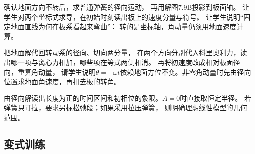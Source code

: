 \documentclass[UTF8,fontset=fandol,a4paper,11pt]{ctexart}
\begin{document}
确认地面方向不转后，求普通弹簧的径向运动，
再用解图7.9B投影到板面轴。
让学生对两个坐标式求导，在初始时刻读出板上的速度分量与符号。
让学生说明“固定地面直线为何在板系看起来弯曲”：
转的是坐标轴，角动量仍须用地面速度计算。

把地面解代回转动系的径向、切向两分量，
在两个方向分别代入科里奥利力，读出哪一项与离心力相加，哪些项在等式两侧相消。
再将初速度改成相对板面径向，重算角动量，
请学生说明$\theta=-\omega t$依赖地面方位不变。非零角动量时先由径向位置求地面角速度，再扣去板的转角。

由径向解读出长度为正的时间区间和初相位的象限。$A=0$时直接取恒定半径。
若弹簧只可拉，要求另标松弛段；如果采用拉压弹簧，
则明确理想线性模型的几何范围。




\subsection*{变式训练}
\end{document}
